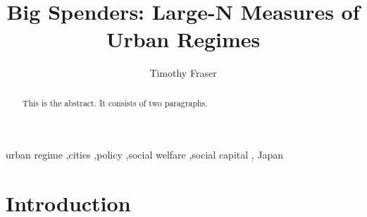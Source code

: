 \documentclass[preprint, 3p,
authoryear]{elsarticle} %
\begin{document}
\begin{frontmatter}

  \title{Big Spenders: Large-N Measures of Urban Regimes}
    \author[Department of Political Science, Northeastern
University]{Timothy Fraser%
  }
  
  \begin{abstract}
  This is the abstract. It consists of two paragraphs.
  \end{abstract}
    \begin{keyword}
    urban regime \sep cities \sep policy \sep social welfare \sep social
capital \sep 
    Japan
  \end{keyword}
  
 \end{frontmatter}

\captionsetup[table]{labelformat=empty}
\captionsetup[figure]{labelformat=empty}
\captionsetup{font=large}

\hypertarget{introduction}{%
\section{Introduction}\label{introduction}}
\end{document}
